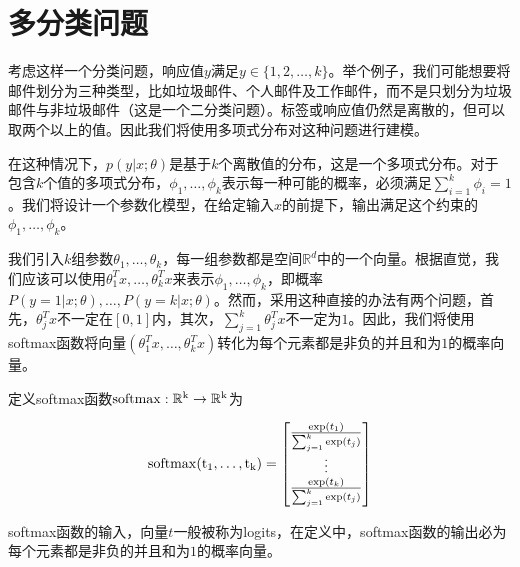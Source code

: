 \section{多分类问题}

考虑这样一个分类问题，响应值$y$满足$y\in\{1,2,\ldots,k\}$。举个例子，我们可能想要将邮件划分为三种类型，比如垃圾邮件、个人邮件及工作邮件，而不是只划分为垃圾邮件与非垃圾邮件（这是一个二分类问题）。标签或响应值仍然是离散的，但可以取两个以上的值。因此我们将使用多项式分布对这种问题进行建模。

在这种情况下，$p(y | x;\theta)$是基于$k$个离散值的分布，这是一个多项式分布。对于包含$k$个值的多项式分布，$\phi_1,\ldots,\phi_k$表示每一种可能的概率，必须满足$\sum^k_{i=1}\phi_i=1$。我们将设计一个参数化模型，在给定输入$x$的前提下，输出满足这个约束的$\phi_1,\ldots,\phi_k$。

我们引入$k$组参数$\theta_1,\ldots,\theta_k$，每一组参数都是空间$\mathbb{R}^d$中的一个向量。根据直觉，我们应该可以使用$\theta_1^Tx,\ldots,\theta_k^Tx$来表示$\phi_1,\ldots,\phi_k$，即概率$P(y=1 | x;\theta),\ldots,P(y=k | x;\theta)$。然而，采用这种直接的办法有两个问题，首先，$\theta_j^Tx$不一定在$[0,1]$内，其次，$\sum^k_{j=1}\theta_j^Tx$不一定为$1$。因此，我们将使用softmax函数将向量$(\theta_1^T x,\ldots,\theta_k^T x)$转化为每个元素都是非负的并且和为$1$的概率向量。

定义softmax函数$\rm{softmax}:\mathbb{R}^k \rightarrow \mathbb{R}^k$为

\begin{equation}
  \rm{softmax}(t_1,\ldots,t_k)=
  \begin{bmatrix}
    \frac{{\rm{exp}} (t_1)}{\sum^k_{j=1}{\rm{exp}} (t_j)} \\
    \vdots                                                \\
    \frac{{\rm{exp}} (t_k)}{\sum^k_{j=1}{\rm{exp}} (t_j)} \\
  \end{bmatrix}
\end{equation}

softmax函数的输入，向量$t$一般被称为logits，在定义中，softmax函数的输出必为每个元素都是非负的并且和为$1$的概率向量。

